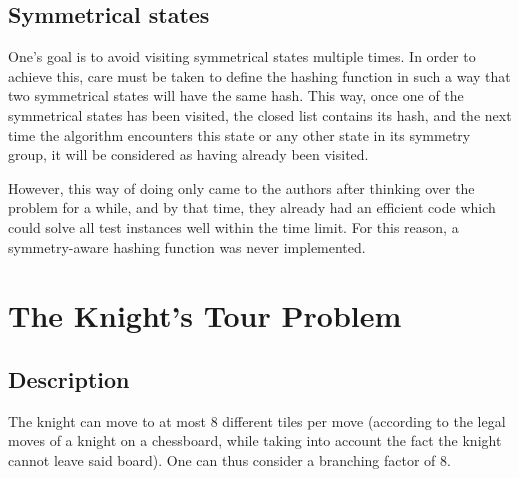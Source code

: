 \documentclass[journal]{IEEEtran}
\begin{document}
 \subsection{Symmetrical states} One's goal is to avoid visiting symmetrical states multiple times.
 In order to achieve this, care must be taken to define the hashing function in such a way that two symmetrical states will have the same hash.
 This way, once one of the symmetrical states has been visited, the closed list contains its hash, and the next time the algorithm encounters this state or any other state in its symmetry group, it will be considered as having already been visited.
 
 However, this way of doing only came to the authors after thinking over the problem for a while, and by that time, they already had an efficient code which could solve all test instances well within the time limit.
 For this reason, a symmetry-aware hashing function was never implemented.


\section{The Knight’s Tour Problem}
\subsection{Description}
The knight can move to at most 8 different tiles per move (according to the legal moves of a knight on a chessboard, while taking into account the fact the knight cannot leave said board).
 One can thus consider a branching factor of 8.
\end{document}
